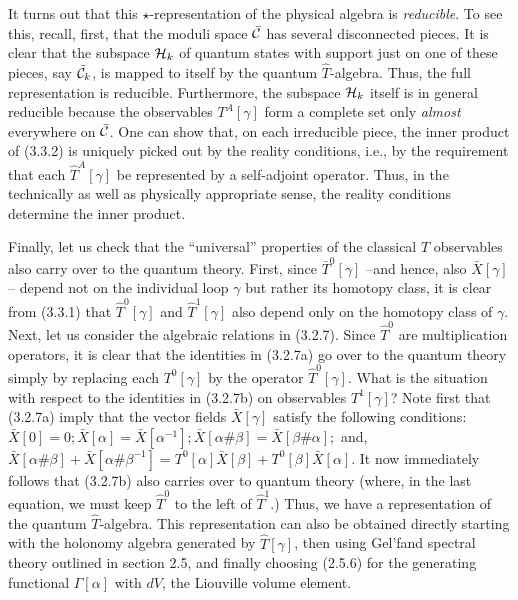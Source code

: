 It turns out that this $\star$-representation of the physical algebra is
{\it reducible}. To see this, recall, first, that the moduli space
$\bar{\cal C}$ has several disconnected pieces. It is clear that the subspace
${\cal H}_k$ of quantum states with support just on one of these pieces, say
$\bar{\cal C}_k$, is mapped to itself by the quantum ${\hat T}$-algebra. Thus,
the full representation is reducible. Furthermore, the subspace ${\cal H}_k$
itself is in general reducible because the observables $T^A[\gamma ]$ form a
complete set only {\it almost} everywhere on $\bar{\cal C}$. One can show that,
on each irreducible piece, the inner product of (3.3.2) is uniquely picked
out by the reality conditions, i.e., by the requirement that each ${\hat T}^A
[\gamma ]$ be represented by a self-adjoint operator. Thus, in the technically
as well as physically appropriate sense, the reality conditions determine
the inner product.

Finally, let us check that the ``universal'' properties of the classical
$T$ observables also carry over to the quantum theory. First, since
$\bar{T}^0[\gamma ]$ --and hence, also $\bar{X}[\gamma ]$-- depend not on the
individual loop $\gamma$ but rather its homotopy class, it is clear from
(3.3.1) that ${\hat T}^0[\gamma ]$ and ${\hat T}^1[\gamma ]$ also depend only
on the homotopy class of $\gamma$. Next, let us consider the algebraic
relations in (3.2.7). Since ${\hat T}^0$ are multiplication operators, it is
clear that the identities in (3.2.7a) go over to the quantum theory simply by
replacing each $T^0[\gamma ]$ by the operator ${\hat T}^0[\gamma ]$. What is
the situation with respect to the identities in (3.2.7b) on observables
$T^1[\gamma ]$? Note first that (3.2.7a) imply that the vector fields
$\bar{X}[\gamma ]$ satisfy the following conditions:
$\bar{X}[0] =0 ; \bar{X}[\alpha ]= \bar{X}[\alpha^{-1}];
\bar{X}[\alpha\#\beta ] = \bar{X}[\beta\#\alpha ];$ and,
$\bar{X}[\alpha\#\beta ] + \bar{X}[\alpha \#\beta^{-1}] = T^0[\alpha ]
\bar{X}[\beta ] + T^0[\beta ] \bar{X}[\alpha ]$. It now immediately follows
that (3.2.7b) also carries over to quantum theory (where, in the last
equation, we must keep ${\hat T}^0$ to the left of ${\hat T}^1$.)
Thus, we have a representation of the quantum $\hat{T}$-algebra. This
representation can also be obtained directly starting with the holonomy
algebra generated by $\hat{T}[\gamma ]$, then using Gel'fand spectral
theory outlined in section 2.5, and finally choosing (2.5.6) for the
generating functional $\Gamma [\alpha ]$ with $dV$, the Liouville volume
element.

